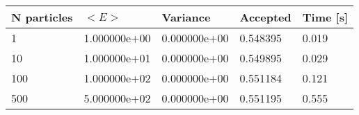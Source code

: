 \begin{table}[h!]
\begin{tabular}{|l|l|l|l|l|}
\hline 
N particles & $<E>$ & Variance & Accepted & Time [s]\\ 
 \hline 
1 & 1.000000e+00 & 0.000000e+00 & 0.548395 & 0.019 \\ \hline 
10 & 1.000000e+01 & 0.000000e+00 & 0.549895 & 0.029 \\ \hline 
100 & 1.000000e+02 & 0.000000e+00 & 0.551184 & 0.121 \\ \hline 
500 & 5.000000e+02 & 0.000000e+00 & 0.551195 & 0.555 \\ \hline 
\end{tabular}
\label{tab:ha2} 
\end{table} 
